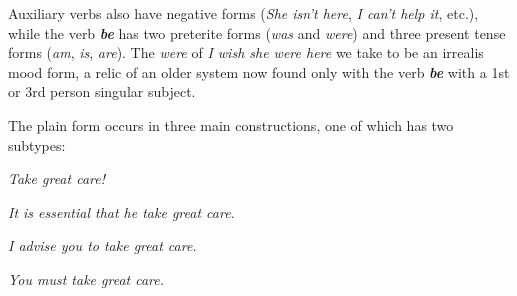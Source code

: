 \noindent Auxiliary verbs also have negative forms (\textit{She isn't here}, \textit{I can't help it}, etc.), while the verb \textit{\textbf{be}} has two preterite forms (\textit{was} and \textit{were}) and three present tense forms (\textit{am}, \textit{is}, \textit{are}). The \textit{were} of \textit{I wish she were here} we take to be an irrealis mood form, a relic of an older system now found only with the verb \textit{\textbf{be}} with a 1st or 3rd person singular subject.

\newpage

The plain form occurs in three main constructions, one of which has two subtypes:

\newlength{\labwidthA}
\newlength{\labwidthB}
\begin{examples}
\item \label{ex:13}
    \begin{examples}
        \item \label{ex:13i} \hspace{1.7em}  \hspace{2.2em}\itshape Take great care!
        \item \label{ex:13ii} \hspace{1.7em}   \hspace{2.2em}\itshape It is essential \ob that he take great care\cb.
        \item \label{ex:13iii}
            \begin{examples}
                \item \label{ex:13iiia}  \itshape I advise you \ob to take great care\cb.
                \item \label{ex:13iiib}  \itshape You must \ob take great care\cb.
            \end{examples}
    \end{examples}
\end{examples}

